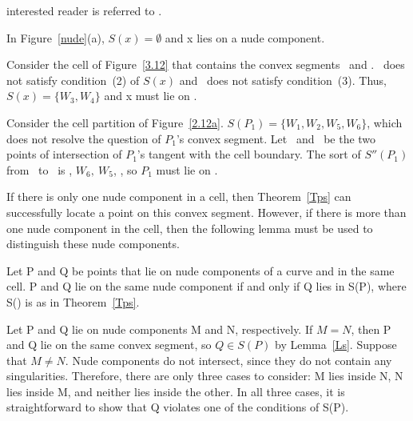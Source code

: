 interested reader is referred to \cite{jj}.  %
\QED
%
\begin{example}

In Figure~\ref{nude}(a), $S(x) = \emptyset$ and x lies on a nude component.

Consider the cell of Figure~\ref{3.12} that contains the convex segments 
\wwa\ and .
\wo\ does not satisfy condition~(2) of $S(x)$ and \wt\ does not satisfy condition~(3).
Thus, $S(x) = \{W_{3},W_{4}\}$ and x must lie on .

Consider the cell partition of Figure~\ref{2.12a}.
$S(P_{1}) = \{W_{1},W_{2},W_{5},W_{6}\}$, which does not resolve the question
of $P_{1}$'s convex segment.
Let \xo\ and \xt\ be the two points of intersection of $P_{1}$'s tangent
with the cell boundary.
The sort of $S''(P_{1})$ from \xo\ to \xt\ is \wo, $W_{6},\ W_{5}$, \wt, 
so $P_{1}$ must lie on \wwa.
\end{example}
%

If there is only one nude component in a cell, then Theorem~\ref{Tps} 
can successfully locate a point on this convex segment.
However, if there is more than one nude component in the cell, then the following
lemma must be used to distinguish these nude components.

\begin{lemma}
\label{Ln}
Let P and Q be points that lie on nude components of a curve and in the same cell.
P and Q lie on the same nude component if and only if 
Q lies in S(P), where S() is as in Theorem~\ref{Tps}.
\end{lemma}

Let P and Q lie on nude components M and N, respectively.
If $M=N$, then P and Q lie on the same convex segment, so $Q \in S(P)$ by
Lemma~\ref{Ls}.
Suppose that $M \neq N$.
Nude components do not intersect, since they do not contain any singularities.
Therefore, there are only three cases to consider: M lies inside N, N lies 
inside M, and neither lies inside the other.
In all three cases, it is straightforward to show that Q violates one of the conditions
of S(P).
\QED

